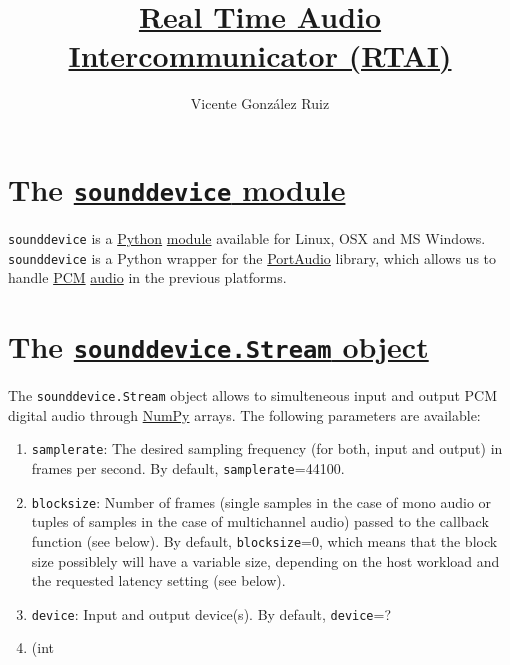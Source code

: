 
\title{\href{https://github.com/Tecnologias-Multimedia/intercom}{Real
    Time Audio Intercommunicator  (RTAI)}}

\author{Vicente González Ruiz}

\maketitle
\tableofcontents
\section{The
  \href{https://python-sounddevice.readthedocs.io}{\texttt{sounddevice}
    module}}

\texttt{sounddevice} is a \href{https://www.python.org}{Python}
\href{https://docs.python.org/3/tutorial/modules.html}{module}
available for Linux, OSX and MS Windows. \texttt{sounddevice} is a
Python wrapper for the \href{http://www.portaudio.com}{PortAudio}
library, which allows us to handle
\href{https://en.wikipedia.org/wiki/Pulse-code_modulation}{PCM}
\href{https://en.wikipedia.org/wiki/Digital_audio}{audio} in the
previous platforms.


\section{The
  \href{https://python-sounddevice.readthedocs.io/en/0.3.15/api/streams.html}{\texttt{sounddevice.Stream}
    object}}

The \texttt{sounddevice.Stream} object allows to simulteneous input
and output PCM digital audio through \href{https://numpy.org}{NumPy}
arrays. The following parameters are available:
\begin{enumerate}
\item \texttt{samplerate}: The desired sampling frequency (for both,
  input and output) in frames per second. By default,
  \texttt{samplerate}=44100.
\item \texttt{blocksize}: Number of frames (single samples
  in the case of mono audio or tuples of samples in the case of multichannel
  audio) passed to the callback function (see below). By default,
  \texttt{blocksize}=0, which means that the block size possiblely
  will have a variable size, depending on the host workload and the
  requested latency setting (see below).
\item \texttt{device}: Input and output device(s). By default, \texttt{device}=?
\item (int
\end{enumerate}


